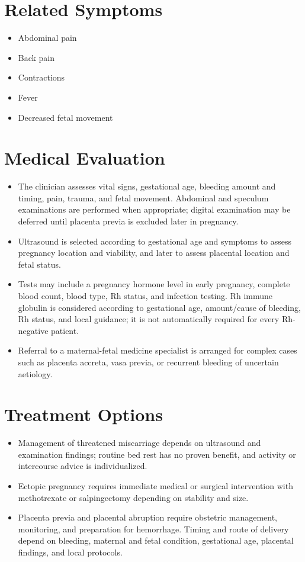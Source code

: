\section*{Related Symptoms}
\begin{itemize}
 \item Abdominal pain
 \item Back pain
 \item Contractions
 \item Fever
 \item Decreased fetal movement
\end{itemize}


\section*{Medical Evaluation}
\begin{itemize}
 \item The clinician assesses vital signs, gestational age, bleeding amount and timing, pain, trauma, and fetal movement. Abdominal and speculum examinations are performed when appropriate; digital examination may be deferred until placenta previa is excluded later in pregnancy.
 \item Ultrasound is selected according to gestational age and symptoms to assess pregnancy location and viability, and later to assess placental location and fetal status.
 \item Tests may include a pregnancy hormone level in early pregnancy, complete blood count, blood type, Rh status, and infection testing. Rh immune globulin is considered according to gestational age, amount/cause of bleeding, Rh status, and local guidance; it is not automatically required for every Rh-negative patient.
 \item Referral to a maternal-fetal medicine specialist is arranged for complex cases such as placenta accreta, vasa previa, or recurrent bleeding of uncertain aetiology.
\end{itemize}

\section*{Treatment Options}
\begin{itemize}
 \item Management of threatened miscarriage depends on ultrasound and examination findings; routine bed rest has no proven benefit, and activity or intercourse advice is individualized.
 \item Ectopic pregnancy requires immediate medical or surgical intervention with methotrexate or salpingectomy depending on stability and size.
 \item Placenta previa and placental abruption require obstetric management, monitoring, and preparation for hemorrhage. Timing and route of delivery depend on bleeding, maternal and fetal condition, gestational age, placental findings, and local protocols.
\end{itemize}

